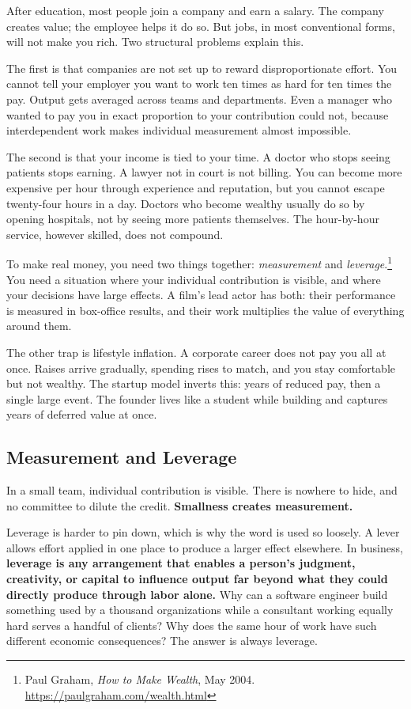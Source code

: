 After education, most people join a company and earn a salary. The company creates value; the employee helps it do so. But jobs, in most conventional forms, will not make you rich. Two structural problems explain this.

The first is that companies are not set up to reward disproportionate effort. You cannot tell your employer you want to work ten times as hard for ten times the pay. Output gets averaged across teams and departments. Even a manager who wanted to pay you in exact proportion to your contribution could not, because interdependent work makes individual measurement almost impossible.

The second is that your income is tied to your time. A doctor who stops seeing patients stops earning. A lawyer not in court is not billing. You can become more expensive per hour through experience and reputation, but you cannot escape twenty-four hours in a day. Doctors who become wealthy usually do so by opening hospitals, not by seeing more patients themselves. The hour-by-hour service, however skilled, does not compound.

To make real money, you need two things together: \emph{measurement} and \emph{leverage}.\footnote{Paul Graham, \emph{How to Make Wealth}, May 2004. \url{https://paulgraham.com/wealth.html}} You need a situation where your individual contribution is visible, and where your decisions have large effects. A film's lead actor has both: their performance is measured in box-office results, and their work multiplies the value of everything around them.

The other trap is lifestyle inflation. A corporate career does not pay you all at once. Raises arrive gradually, spending rises to match, and you stay comfortable but not wealthy. The startup model inverts this: years of reduced pay, then a single large event. The founder lives like a student while building and captures years of deferred value at once.

\subsection{Measurement and Leverage}

In a small team, individual contribution is visible. There is nowhere to hide, and no committee to dilute the credit. \textbf{Smallness creates measurement.}

Leverage is harder to pin down, which is why the word is used so loosely. A lever allows effort applied in one place to produce a larger effect elsewhere. In business, \textbf{leverage is any arrangement that enables a person's judgment, creativity, or capital to influence output far beyond what they could directly produce through labor alone.} Why can a software engineer build something used by a thousand organizations while a consultant working equally hard serves a handful of clients? Why does the same hour of work have such different economic consequences? The answer is always leverage.

